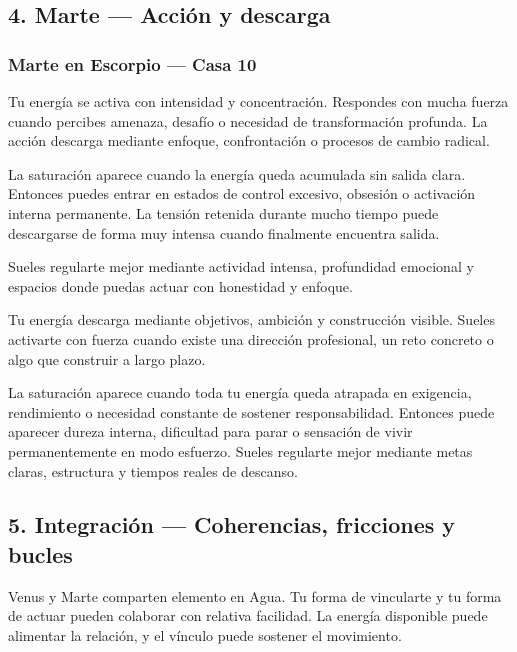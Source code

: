 \documentclass[11pt,a4paper]{article}
\begin{document}
\vspace{0.8cm}

\subsection{4. Marte — Acción y descarga}

\subsubsection*{Marte en Escorpio — Casa 10}

\justifying
Tu energía se activa con intensidad y concentración. Respondes con mucha fuerza cuando percibes amenaza, desafío o necesidad de transformación profunda. La acción descarga mediante enfoque, confrontación o procesos de cambio radical.

La saturación aparece cuando la energía queda acumulada sin salida clara. Entonces puedes entrar en estados de control excesivo, obsesión o activación interna permanente. La tensión retenida durante mucho tiempo puede descargarse de forma muy intensa cuando finalmente encuentra salida.

Sueles regularte mejor mediante actividad intensa, profundidad emocional y espacios donde puedas actuar con honestidad y enfoque.

Tu energía descarga mediante objetivos, ambición y construcción visible. Sueles activarte con fuerza cuando existe una dirección profesional, un reto concreto o algo que construir a largo plazo.

La saturación aparece cuando toda tu energía queda atrapada en exigencia, rendimiento o necesidad constante de sostener responsabilidad. Entonces puede aparecer dureza interna, dificultad para parar o sensación de vivir permanentemente en modo esfuerzo. Sueles regularte mejor mediante metas claras, estructura y tiempos reales de descanso.

\vspace{0.8cm}

\subsection{5. Integración — Coherencias, fricciones y bucles}

\justifying
Venus y Marte comparten elemento en Agua. Tu forma de vincularte y tu forma de actuar pueden colaborar con relativa facilidad. La energía disponible puede alimentar la relación, y el vínculo puede sostener el movimiento.
\end{document}
